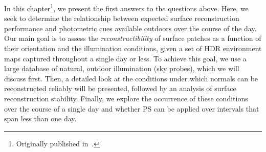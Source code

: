 
In this chapter\footnote{Originally published in~\cite{holdgeoffroy-iccp-15,holdgeoffroy-3dv-15}.}, we present the first answers to the questions above. Here, we seek to determine the relationship between expected surface reconstruction performance and photometric cues available outdoors over the course of the day. Our main goal is to assess the \emph{reconstructibility} of surface patches as a function of their orientation and the illumination conditions, given a set of HDR environment maps captured throughout a single day or less. To achieve this goal, we use a large database of natural, outdoor illumination (sky probes), which we will discuss first. Then, a detailed look at the conditions under which normals can be reconstructed reliably will be presented, followed by an analysis of surface reconstruction stability. Finally, we explore the occurrence of these conditions over the course of a single day and whether PS can be applied over intervals that span less than one day. 




